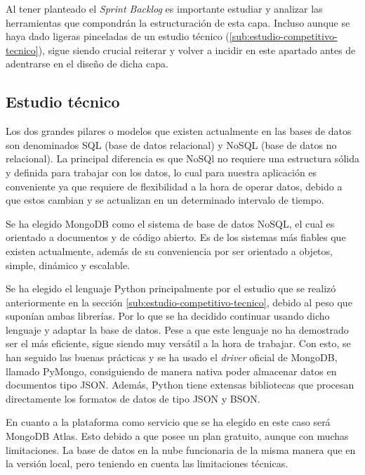 \vspace{0.3cm}

Al tener planteado el \textit{Sprint Backlog} es importante estudiar y analizar las herramientas que compondrán la estructuración de esta capa. Incluso aunque se haya dado ligeras pinceladas de un estudio técnico (\ref{sub:estudio-competitivo-tecnico}), sigue siendo crucial reiterar y volver a incidir en este apartado antes de adentrarse en el diseño de dicha capa.

\subsection{Estudio técnico}
Los dos grandes pilares o modelos que existen actualmente en las bases de datos son denominados SQL (base de datos relacional) y NoSQL (base de datos no relacional). La principal diferencia es que NoSQl no requiere una estructura sólida y definida para trabajar con los datos, lo cual para nuestra aplicación es conveniente ya que requiere de flexibilidad a la hora de operar datos, debido a que estos cambian y se actualizan en un determinado intervalo de tiempo.

\vspace{0.3cm}

Se ha elegido MongoDB como el sistema de base de datos NoSQL, el cual es orientado a documentos y de código abierto. Es de los sistemas más fiables que existen actualmente, además de su conveniencia por ser orientado a objetos, simple, dinámico y escalable. \cite{mongodb-manual}

\vspace{0.3cm}

Se ha elegido el lenguaje Python principalmente por el estudio que se realizó anteriormente en la sección \ref{sub:estudio-competitivo-tecnico}, debido al peso que suponían ambas librerías. Por lo que se ha decidido continuar usando dicho lenguaje y adaptar la base de datos. Pese a que este lenguaje no ha demostrado ser el más eficiente, sigue siendo muy versátil a la hora de trabajar. Con esto, se han seguido las buenas prácticas y se ha usado el \textit{driver} oficial de MongoDB, llamado PyMongo, consiguiendo de manera nativa poder almacenar datos en documentos tipo JSON. Además, Python tiene extensas bibliotecas que procesan directamente los formatos de datos de tipo JSON y BSON. \cite{mongodb-manual}

\vspace{0.3cm}

En cuanto a la plataforma como servicio que se ha elegido en este caso será MongoDB Atlas. Esto debido a que posee un plan gratuito, aunque con muchas limitaciones. La base de datos en la nube funcionaria de la misma manera que en la versión local, pero teniendo en cuenta las limitaciones técnicas.

